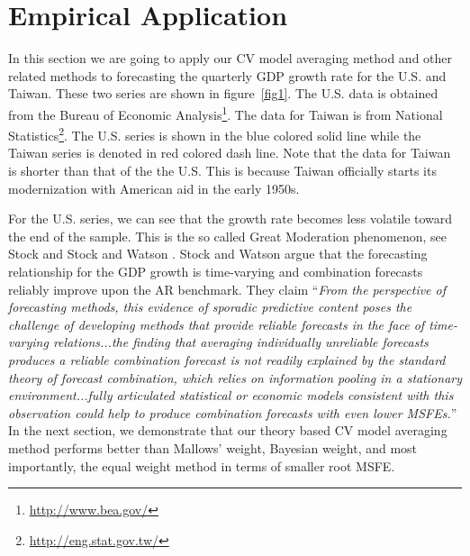 \section{Empirical Application}
In this section we are going to apply our CV model averaging method and other related methods to forecasting the quarterly GDP growth rate for the U.S. and Taiwan. These two series are shown in figure~\ref{fig1}. The U.S. data is obtained from the Bureau of Economic Analysis\footnote{\url{http://www.bea.gov/}}. The data for Taiwan is from National Statistics\footnote{\url{http://eng.stat.gov.tw/}}. The U.S. series is shown in the blue colored solid line while the Taiwan series is denoted in red colored dash line. Note that the data for Taiwan is shorter than that of the the U.S. This is because Taiwan officially starts its modernization with American aid in the early 1950s.

For the U.S. series, we can see that the growth rate becomes less volatile toward the end of the sample. This is the so called Great Moderation phenomenon, see Stock \cite{Stock_DEECON2004} and Stock and Watson \cite{Stock_Watson_JEL2003}. Stock and Watson argue that the forecasting relationship for the GDP growth is time-varying and combination forecasts reliably improve upon the AR benchmark. They claim ``\emph{From the perspective of forecasting methods, this evidence of sporadic predictive content poses the challenge of developing methods that provide reliable forecasts in the face of time-varying relations...the finding that averaging individually unreliable forecasts produces a reliable combination forecast is not readily explained by the standard theory of forecast combination, which relies on information pooling in a stationary environment...fully articulated statistical or economic models consistent with this observation could help to produce combination forecasts with even lower MSFEs.}'' In the next section, we demonstrate that our theory based CV model averaging method performs better than Mallows' weight, Bayesian weight, and most importantly, the equal weight method in terms of smaller root MSFE.

